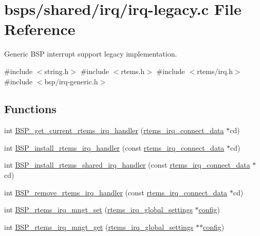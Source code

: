 \hypertarget{irq-legacy_8c}{}\section{bsps/shared/irq/irq-\/legacy.c File Reference}
\label{irq-legacy_8c}


Generic B\+SP interrupt support legacy implementation.  


{\ttfamily \#include $<$string.\+h$>$}\newline
{\ttfamily \#include $<$rtems.\+h$>$}\newline
{\ttfamily \#include $<$rtems/irq.\+h$>$}\newline
{\ttfamily \#include $<$bsp/irq-\/generic.\+h$>$}\newline
\subsection*{Functions}
\begin{DoxyCompactItemize}
\item 
int \mbox{\hyperlink{irq-legacy_8c_a58a7375c32f3af8b27a7c6f8affa68dd}{B\+S\+P\+\_\+get\+\_\+current\+\_\+rtems\+\_\+irq\+\_\+handler}} (\mbox{\hyperlink{struct____rtems__irq__connect__data____}{rtems\+\_\+irq\+\_\+connect\+\_\+data}} $\ast$cd)
\item 
int \mbox{\hyperlink{irq-legacy_8c_aafe4bbaa5e7fb14cfe9da0a0eeab677f}{B\+S\+P\+\_\+install\+\_\+rtems\+\_\+irq\+\_\+handler}} (const \mbox{\hyperlink{struct____rtems__irq__connect__data____}{rtems\+\_\+irq\+\_\+connect\+\_\+data}} $\ast$cd)
\item 
int \mbox{\hyperlink{irq-legacy_8c_acab7c86c6044f62f97cf47be2599c121}{B\+S\+P\+\_\+install\+\_\+rtems\+\_\+shared\+\_\+irq\+\_\+handler}} (const \mbox{\hyperlink{struct____rtems__irq__connect__data____}{rtems\+\_\+irq\+\_\+connect\+\_\+data}} $\ast$cd)
\item 
int \mbox{\hyperlink{irq-legacy_8c_ad2275e290ae086c1b8a78168da08f0ee}{B\+S\+P\+\_\+remove\+\_\+rtems\+\_\+irq\+\_\+handler}} (const \mbox{\hyperlink{struct____rtems__irq__connect__data____}{rtems\+\_\+irq\+\_\+connect\+\_\+data}} $\ast$cd)
\item 
int \mbox{\hyperlink{irq-legacy_8c_a816465eef6ad100fa2bd72f38933721b}{B\+S\+P\+\_\+rtems\+\_\+irq\+\_\+mngt\+\_\+set}} (\mbox{\hyperlink{structrtems__irq__global__settings}{rtems\+\_\+irq\+\_\+global\+\_\+settings}} $\ast$\mbox{\hyperlink{structconfig__s}{config}})
\item 
int \mbox{\hyperlink{irq-legacy_8c_a6d11c2b507d8ecb701bc14317ee0074c}{B\+S\+P\+\_\+rtems\+\_\+irq\+\_\+mngt\+\_\+get}} (\mbox{\hyperlink{structrtems__irq__global__settings}{rtems\+\_\+irq\+\_\+global\+\_\+settings}} $\ast$$\ast$\mbox{\hyperlink{structconfig__s}{config}})
\end{DoxyCompactItemize}


